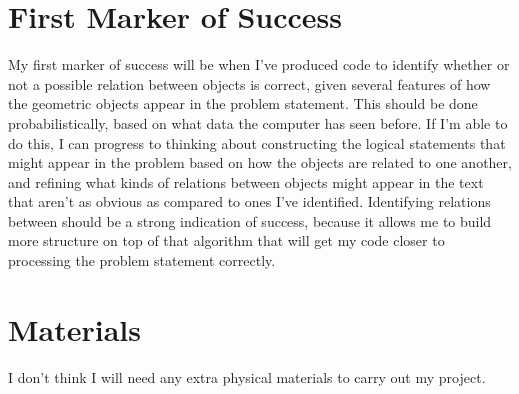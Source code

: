 \documentclass[12pt]{scrartcl}
\begin{document}
\section{First Marker of Success}
My first marker of success will be when I've produced code to identify whether or not a possible relation between objects is correct, given several features of how the geometric objects appear in the problem statement. This should be done probabilistically, based on what data the computer has seen before. If I'm able to do this, I can progress to thinking about constructing the logical statements that might appear in the problem based on how the objects are related to one another, and refining what kinds of relations between objects might appear in the text that aren't as obvious as compared to ones I've identified. Identifying relations between should be a strong indication of success, because it allows me to build more structure on top of that algorithm that will get my code closer to processing the problem statement correctly. 

\section{Materials}
I don't think I will need any extra physical materials to carry out my project. 
\end{document}
